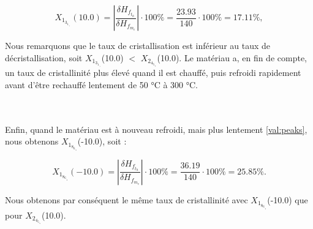 \[
	X_1_3_1_._1(10.0) = |\frac{\delta H_f_t_h}{\delta H_f_m_e}| \cdot 100\% = \frac{23.93}{140} \cdot 100\% = 17.11 \%,
\]

Nous remarquons que le taux de cristallisation est inférieur au taux de décristallisation, soit $X_1_3_1_._1$(10.0) $<$ $X_2_4_5_._9$(10.0). Le matériau a, en fin de compte, un taux de cristallinité plus élevé quand il est chauffé, puis refroidi rapidement avant d’être rechauffé lentement de 50 °C à 300 °C.

\\\\
Enfin, quand le matériau est à nouveau refroidi, mais plus lentement \ref{val:peaks}, nous obtenons $X_1_8_6_._8$(-10.0), soit : 

\[
        X_1_8_6_._8(-10.0) = |\frac{\delta H_f_t_h}{\delta H_f_m_e}| \cdot 100\% = \frac{36.19}{140} \cdot 100\% = 25.85 \%.
\]

Nous obtenons par conséquent le même taux de cristallinité avec $X_1_8_6_._8$(-10.0) que pour $X_2_4_5_._9$(10.0).

